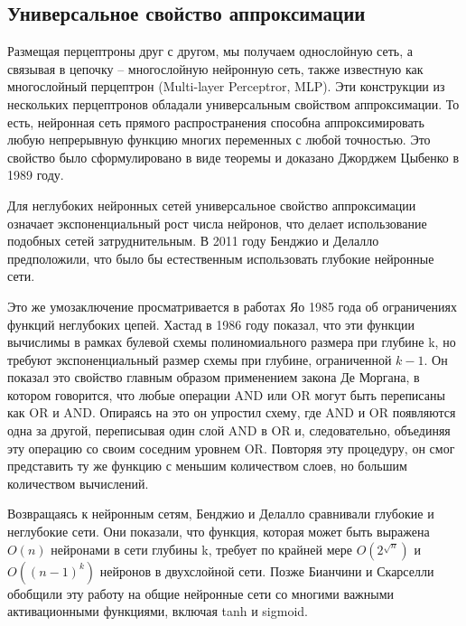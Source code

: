 \subsection{Универсальное свойство аппроксимации}
Размещая перцептроны друг с другом, мы получаем однослойную сеть, а связывая в цепочку – многослойную нейронную сеть, также известную как многослойный перцептрон (Multi-layer Perceptror, MLP). Эти конструкции из нескольких перцептронов обладали универсальным свойством аппроксимации. То есть, нейронная сеть прямого распространения способна аппроксимировать любую непрерывную функцию многих переменных с любой точностью. Это свойство было сформулировано в виде теоремы и доказано  Джорджем Цыбенко в 1989 году\cite{cyb}.
\par
Для неглубоких нейронных сетей универсальное свойство аппроксимации означает экспоненциальный рост числа нейронов, что делает использование подобных сетей затруднительным. В 2011 году Бенджио и Делалло  предположили, что было бы естественным использовать глубокие нейронные сети.
\par
Это же умозаключение просматривается в работах Яо 1985\cite{yao} года об ограничениях функций неглубоких цепей. Хастад в 1986\cite{hastad} году показал, что эти функции вычислимы в рамках булевой схемы полиномиального размера      при глубине k, но требуют экспоненциальный размер схемы при глубине, ограниченной $k-1$. Он показал это свойство главным образом применением закона Де Моргана, в котором говорится, что любые операции AND или OR могут быть переписаны как OR и AND. Опираясь на это он упростил схему, где AND и OR появляются одна за другой, переписывая один слой AND в OR и, следовательно, объединяя эту операцию со своим соседним уровнем OR. Повторяя эту процедуру, он смог представить ту же функцию с меньшим количеством слоев, но большим количеством вычислений.
\par
Возвращаясь к нейронным сетям, Бенджио и Делалло\cite{shaldp} сравнивали глубокие и неглубокие сети. Они показали, что функция, которая может быть выражена $O(n)$ нейронами в сети глубины k, требует по крайней мере $O(2^{\sqrt{n}})$ и $O((n-1)^k)$ нейронов в двухслойной сети. Позже Бианчини и Скарселли обобщили эту работу на общие нейронные сети со многими важными активационными функциями, включая tanh и sigmoid.
